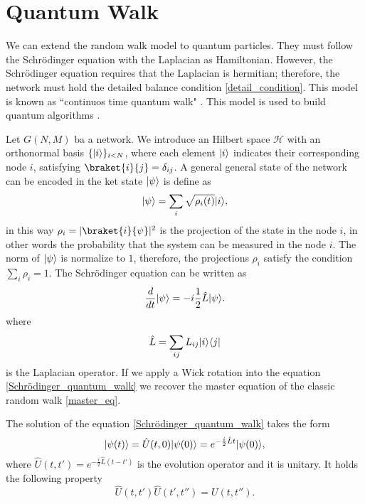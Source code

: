 \section{Quantum Walk}
We can extend the random walk model to quantum particles. 
They must follow the Schrödinger equation with the Laplacian as Hamiltonian. However, the Schrödinger equation requires that the Laplacian is hermitian; therefore, the network must hold the detailed balance condition \eqref{detail_condition}.
This model is known as “continuos time quantum walk" \cite{Farhi_98, quantum_walk}. This model is used to build quantum algorithms \cite{Quantum_walk_Google, classic_to_quantum_networks}.

Let $G(N,M)$ ba a network. We introduce an Hilbert space $\mathcal{H}$ with an orthonormal basis $\{\lvert i\rangle\}_{i<N}$, where each element $\lvert i\rangle$ indicates their corresponding node $i$, satisfying $\braket{i}{j}=\delta_{ij}$. 
A general general state of the network can be encoded in the ket state $\lvert\psi\rangle$ is define as
\begin{equation}\label{ket_state_quantum}
    \lvert\psi\rangle = \sum_i \sqrt{\rho_i(t)} \lvert i\rangle,
\end{equation}
in this way $\rho_i = |\braket{i}{\psi}|^2$ is the projection of the state in the node $i$, in other words the probability that the system can be measured in the node $i$. The norm of $\lvert\psi\rangle$ is normalize to $1$, therefore, the projections $\rho_i$ satisfy the condition $\sum_i \rho_i = 1$.
The Schrödinger equation can be written as
\begin{equation}\label{Schrödinger_quantum_walk}
    \frac{d}{dt}\lvert\psi\rangle = -i\frac{1}{2}\hat L\lvert\psi\rangle.
\end{equation}
where 
\begin{equation}\label{Laplacian_operator}
    \hat L = \sum_{ij} L_{ij}\lvert i\rangle\langle j\rvert
\end{equation}
is the Laplacian operator.
If we apply a Wick rotation into the equation \eqref{Schrödinger_quantum_walk} we recover the master equation of the classic random walk \eqref{master_eq}.

The solution of the equation \eqref{Schrödinger_quantum_walk} takes the form
\begin{equation}
    \lvert\psi(t)\rangle = \hat U(t,0) \lvert\psi(0)\rangle = e^{-\frac{i}{2}\hat L t} \lvert\psi(0)\rangle,
\end{equation}
where $\hat U(t,t') =e^{-\frac{i}{2}\hat L (t-t')}$ is the evolution operator and it is unitary. It holds the following property \begin{equation}
    \hat U(t,t')\hat U(t',t'') = U(t,t'') .
\end{equation}

